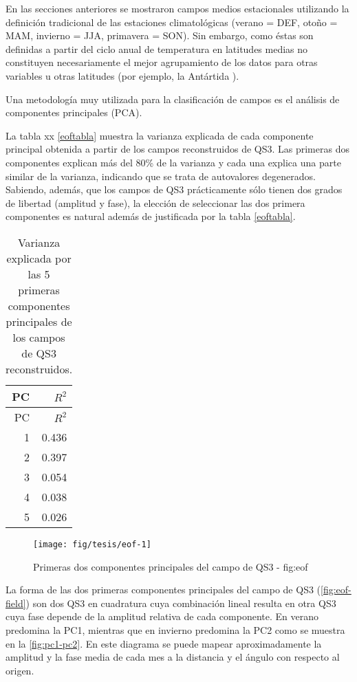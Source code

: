\documentclass[spanish,a4paper]{book}
\begin{document}
En las secciones anteriores se mostraron campos medios estacionales
utilizando la definición tradicional de las estaciones climatológicas
(verano = DEF, otoño = MAM, invierno = JJA, primavera = SON). Sin
embargo, como éstas son definidas a partir del ciclo anual de
temperatura en latitudes medias no constituyen necesariamente el mejor
agrupamiento de los datos para otras variables u otras latitudes (por
ejemplo, la Antártida ).

Una metodología muy utilizada para la clasificación de campos es el
análisis de componentes principales
(PCA).

La tabla xx \ref{eoftabla} muestra la
varianza explicada de cada componente principal obtenida a partir de los
campos reconstruidos de QS3. Las primeras dos componentes explican más
del 80\% de la varianza y cada una explica una parte similar de la
varianza, indicando que se trata de autovalores
degenerados. Sabiendo, además, que los campos
de QS3 prácticamente sólo tienen dos grados de libertad (amplitud y
fase), la elección de seleccionar las dos primera componentes es natural
además de justificada por la tabla \ref{eoftabla}.

\begin{longtable}[]{@{}rr@{}}
\caption{Varianza explicada por las 5 primeras componentes principales
de los campos de QS3 reconstruidos.}\tabularnewline
\toprule
PC & \(R^2\)\tabularnewline
\midrule
\endfirsthead
\toprule
PC & \(R^2\)\tabularnewline
\midrule
\endhead
1 & 0.436\tabularnewline
2 & 0.397\tabularnewline
3 & 0.054\tabularnewline
4 & 0.038\tabularnewline
5 & 0.026\tabularnewline
\bottomrule
\end{longtable}

\begin{figure}
\texttt{[image: fig/tesis/eof-1]} \caption{Primeras dos componentes principales del campo de QS3 - fig:eof}\label{fig:eof}
\end{figure}

La forma de las dos primeras componentes principales del campo de QS3
(\autoref{fig:eof-field}) son dos QS3 en cuadratura cuya combinación
lineal resulta en otra QS3 cuya fase depende de la amplitud relativa de
cada componente. En verano predomina la PC1, mientras que en invierno
predomina la PC2 como se muestra en la \autoref{fig:pc1-pc2}. En este
diagrama se puede mapear aproximadamente la amplitud y la fase media de
cada mes a la distancia y el ángulo con respecto al origen.
\end{document}
